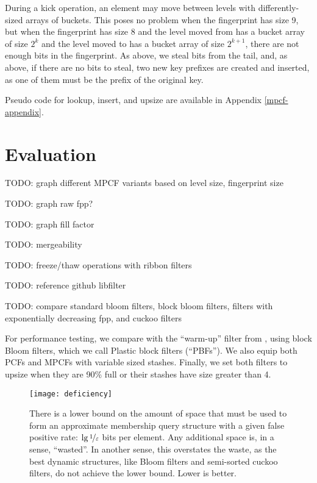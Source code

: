 \documentclass[letterpaper, 11pt]{article}
\begin{document}

During a kick operation, an element may move between levels with differently-sized arrays of buckets.
This poses no problem when the fingerprint has size 9, but when the fingerprint has size 8 and the level moved from has a bucket array of size $2^k$ and the level moved to has a bucket array of size $2^{k+1}$,  there are not enough bits in the fingerprint.
As above, we steal bits from the tail, and, as above, if there are no bits to steal, two new key prefixes are created and inserted, as one of them must be the prefix of the original key.

Pseudo code for lookup, insert, and upsize are available in Appendix \ref{mpcf-appendix}.

\section{Evaluation}
\label{eval}

TODO: graph different MPCF variants based on level size, fingerprint size

TODO: graph raw fpp?

TODO: graph fill factor

TODO: mergeability

TODO: freeze/thaw operations with ribbon filters

TODO: reference github libfilter

TODO: compare standard bloom filters, block bloom filters, filters with exponentially decreasing fpp, and cuckoo filters

For performance testing, we compare with the ``warm-up'' filter from \cite{psw}, using block Bloom filters, which we call Plastic block filters (``PBFs''). \cite{block-bloom}
We also equip both PCFs and MPCFs with variable sized stashes. \cite{stash}
Finally, we set both filters to upsize when they are 90\% full or their stashes have size greater than 4.

\begin{figure}
  \texttt{[image: deficiency]}
  \caption{
    There is a lower bound on the amount of space that must be used to form an approximate membership query structure with a given false positive rate: $\lg \nicefrac{1}{\varepsilon}$ bits per element.
    Any additional space is, in a sense, ``wasted''.
    In another sense, this overstates the waste, as the best dynamic structures, like Bloom filters and semi-sorted cuckoo filters, do not achieve the lower bound.
    Lower is better.
  }
\end{figure}
\end{document}
